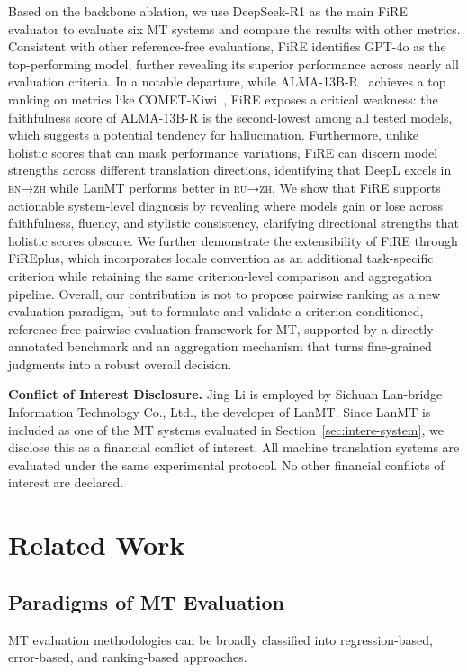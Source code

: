 \documentclass{article}
\theoremstyle{plain}
\theoremstyle{definition}
\theoremstyle{remark}
\newcommand{\enzh}{\textsc{en→zh} }
\newcommand{\ruzhx}{\textsc{ru→zh}}
\newcommand{\ours}{FiRE }
\begin{document}
Based on the backbone ablation, we use DeepSeek-R1 as the main \ours evaluator to evaluate six MT systems and compare the results with other metrics. Consistent with other reference-free evaluations, \ours identifies GPT-4o as the top-performing model, further revealing its superior performance across nearly all evaluation criteria. In a notable departure, while ALMA-13B-R~\citep{DBLP:conf/icml/XuSCTSDM024} achieves a top ranking on metrics like COMET-Kiwi~\citep{Rei2023ScalingUC}, \ours exposes a critical weakness: the faithfulness score of ALMA-13B-R is the second-lowest among all tested models, which suggests a potential tendency for hallucination. Furthermore, unlike holistic scores that can mask performance variations, \ours can discern model strengths across different translation directions, identifying that DeepL excels in \enzh while LanMT performs better in \ruzhx. We show that \ours supports actionable system-level diagnosis by revealing where models gain or lose across faithfulness, fluency, and stylistic consistency, clarifying directional strengths that holistic scores obscure. We further demonstrate the extensibility of FiRE through FiREplus, which incorporates locale convention as an additional task-specific criterion while retaining the same criterion-level comparison and aggregation pipeline. Overall, our contribution is not to propose pairwise ranking as a new evaluation paradigm, but to formulate and validate a criterion-conditioned, reference-free pairwise evaluation framework for MT, supported by a directly annotated benchmark and an aggregation mechanism that turns fine-grained judgments into a robust overall decision.


\textbf{Conflict of Interest Disclosure. }Jing Li is employed by Sichuan Lan-bridge Information Technology Co., Ltd., the developer of LanMT. Since LanMT is included as one of the MT systems evaluated in Section~\ref{sec:intere-system}, we disclose this as a financial conflict of interest. All machine translation systems are evaluated under the same experimental protocol. No other financial conflicts of interest are declared.


\section{Related Work}

\subsection{Paradigms of MT Evaluation}
MT evaluation methodologies can be broadly classified into regression-based, error-based, and ranking-based approaches. 
\end{document}
